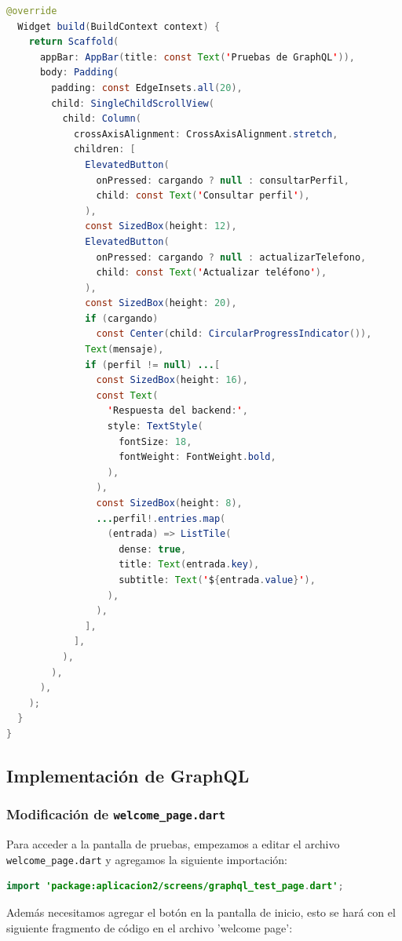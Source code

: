 \begin{lstlisting}[language=Java, caption={graphql\_test\_page.dart}]
  @override
  Widget build(BuildContext context) {
    return Scaffold(
      appBar: AppBar(title: const Text('Pruebas de GraphQL')),
      body: Padding(
        padding: const EdgeInsets.all(20),
        child: SingleChildScrollView(
          child: Column(
            crossAxisAlignment: CrossAxisAlignment.stretch,
            children: [
              ElevatedButton(
                onPressed: cargando ? null : consultarPerfil,
                child: const Text('Consultar perfil'),
              ),
              const SizedBox(height: 12),
              ElevatedButton(
                onPressed: cargando ? null : actualizarTelefono,
                child: const Text('Actualizar teléfono'),
              ),
              const SizedBox(height: 20),
              if (cargando)
                const Center(child: CircularProgressIndicator()),
              Text(mensaje),
              if (perfil != null) ...[
                const SizedBox(height: 16),
                const Text(
                  'Respuesta del backend:',
                  style: TextStyle(
                    fontSize: 18,
                    fontWeight: FontWeight.bold,
                  ),
                ),
                const SizedBox(height: 8),
                ...perfil!.entries.map(
                  (entrada) => ListTile(
                    dense: true,
                    title: Text(entrada.key),
                    subtitle: Text('${entrada.value}'),
                  ),
                ),
              ],
            ],
          ),
        ),
      ),
    );
  }
}

\end{lstlisting}
\subsection{Implementación de GraphQL}
\subsubsection{Modificación de \texttt{welcome\_page.dart}}
Para acceder a la pantalla de pruebas, empezamos a editar el archivo \texttt{welcome\_page.dart} y agregamos la siguiente importación:

\begin{lstlisting}[language=Java, caption={Importación en welcome\_page.dart}]
import 'package:aplicacion2/screens/graphql_test_page.dart';
\end{lstlisting}

Además necesitamos agregar el botón en la pantalla de inicio, esto se hará con el siguiente fragmento de código en el archivo 'welcome page':

